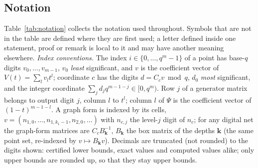 \documentclass[11pt]{amsart}
\theoremstyle{definition}
\theoremstyle{plain}
\begin{document}
\subsection{Notation}\label{sec:conv}
Table~\ref{tab:notation} collects the notation used throughout. Symbols that are not in the table are defined where they are first used; a letter defined inside one statement, proof or remark is local to it and may have another meaning elsewhere. \emph{Index conventions.} The index $i\in\{0,\dots,q^m-1\}$ of a point has base-$q$ digits $v_0,\dots,v_{m-1}$, $v_0$ \emph{least} significant, and $v$ is the coefficient vector of $V(t)=\sum_lv_lt^l$; coordinate $c$ has the digits $d=C_cv\bmod q$, $d_0$ \emph{most} significant, and the integer coordinate $\sum_jd_jq^{m-1-j}\in[0,q^m)$. Row $j$ of a generator matrix belongs to output digit $j$, column $l$ to $t^l$; column $l$ of $\Psi$ is the coefficient vector of $(1-t)^{m-1-l}$. A graph form is indexed by its cells, $v=(n_{1,0},\dots,n_{1,k_1-1},n_{2,0},\dots)$ with $n_{c,j}$ the level-$j$ digit of $n_c$; for any digital net the graph-form matrices are $C_cB_{\mathbf k}^{-1}$, $B_{\mathbf k}$ the box matrix of the depths $\mathbf k$ (the same point set, re-indexed by $v\mapsto B_{\mathbf k}v$). Decimals are truncated (not rounded) to the digits shown: certified lower bounds, exact values and computed values alike; only upper bounds are rounded up, so that they stay upper bounds.
\end{document}
